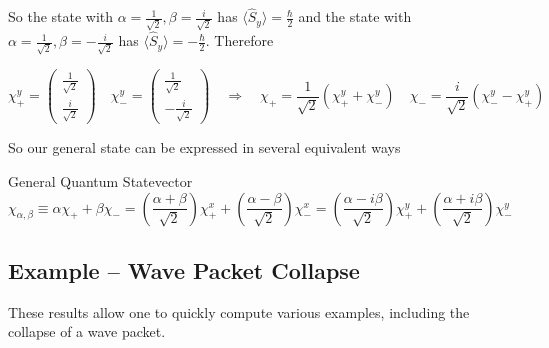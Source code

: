 So the state with $\alpha = \frac{1}{\sqrt{2}}, \beta = \frac{i}{\sqrt{2}}$ has
$\langle \hat{S}_y \rangle = \frac{\hbar}{2}$ and the state with $\alpha
= \frac{1}{\sqrt{2}}, \beta = -\frac{i}{\sqrt{2}}$ has $\langle \hat{S}_y
\rangle = -\frac{\hbar}{2}$. Therefore 

\[
\chi_+^y = \begin{pmatrix}
  \frac{1}{\sqrt{2}} \\ \frac{i}{\sqrt{2}} 
\end{pmatrix} \quad \chi_-^y = \begin{pmatrix}
  \frac{1}{\sqrt{2}} \\ - \frac{i}{\sqrt{2}}
\end{pmatrix} \quad \Rightarrow \quad \chi_+ = \frac{1}{\sqrt{2}} (\chi_+^y
+ \chi_-^y ) \quad \chi_- = \frac{i}{\sqrt{2}} (\chi_-^y - \chi_+^y)
\] \vspace{3px}

So our general state can be expressed in several equivalent ways

\begin{mainbox}{General Quantum Statevector}
  \[ \chi_{\alpha, \beta} \equiv \alpha \chi_+ + \beta \chi_- = \left(
    \frac{\alpha + \beta}{\sqrt{2}} \right) \chi_+^x + \left( \frac{\alpha
  - \beta}{\sqrt{2}} \right) \chi_-^x = \left( \frac{\alpha - i\beta}{\sqrt{2}}
\right) \chi_+^y + \left( \frac{\alpha + i\beta}{\sqrt{2}} \right) \chi_-^y \]     
\end{mainbox}


\subsection{Example -- Wave Packet Collapse}

These results allow one to quickly compute various examples, including the
collapse of a wave packet. 

